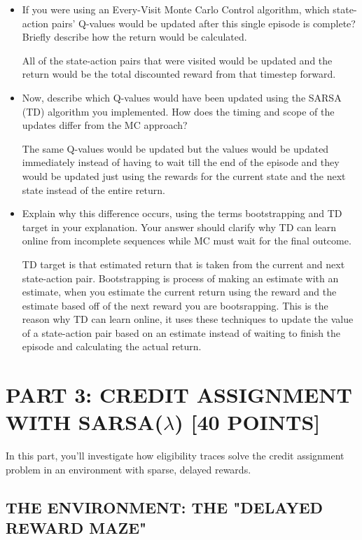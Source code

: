 \documentclass{article}
\begin{document}
\begin{itemize}
    \item If you were using an Every-Visit Monte Carlo Control algorithm, which state-action pairs' Q-values would be updated after this single episode is complete? Briefly describe how the return would be calculated.
    
    All of the state-action pairs that were visited would be updated and the return would be the total discounted reward from that timestep forward.
    
    \item Now, describe which Q-values would have been updated using the SARSA (TD) algorithm you implemented. How does the timing and scope of the updates differ from the MC approach?
    
    The same Q-values would be updated but the values would be updated immediately instead of having to wait till the end of the episode and they would be updated just using the rewards for the current state and the next state instead of the entire return.
    
    \item Explain why this difference occurs, using the terms bootstrapping and TD target in your explanation. Your answer should clarify why TD can learn online from incomplete sequences while MC must wait for the final outcome.
    
    TD target is that estimated return that is taken from the current and next state-action pair.
    Bootstrapping is process of making an estimate with an estimate, when you estimate the current return using the reward and the estimate based off of the next reward you are bootsrapping.
    This is the reason why TD can learn online, it uses these techniques to update the value of a state-action pair based on an estimate instead of waiting to finish the episode and calculating the actual return.
     
\end{itemize}

\section{PART 3: CREDIT ASSIGNMENT WITH SARSA($\lambda$) [40 POINTS]}

In this part, you'll investigate how eligibility traces solve the credit assignment problem in an environment with sparse, delayed rewards.

\subsection{THE ENVIRONMENT: THE "DELAYED REWARD MAZE"}
\end{document}
